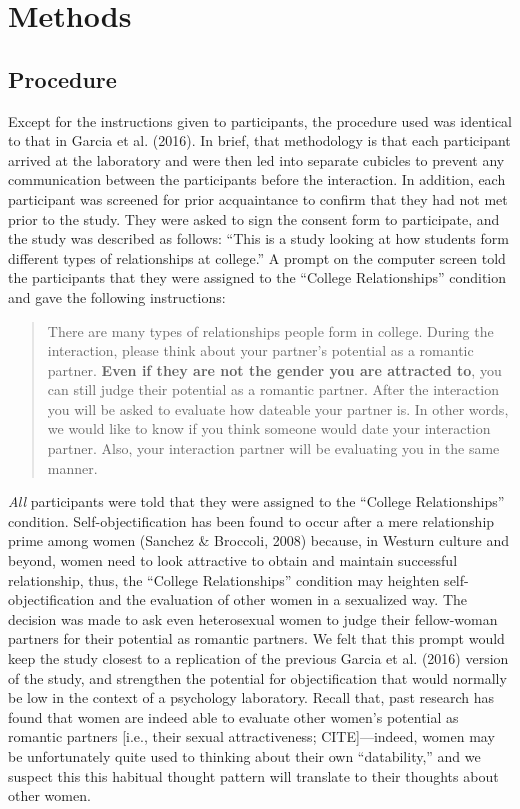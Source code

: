 \documentclass[man]{apa6}
\begin{document}
\section{Methods}\label{methods}

\subsection{Procedure}\label{procedure}

Except for the instructions given to participants, the procedure used
was identical to that in Garcia et al. (2016). In brief, that
methodology is that each participant arrived at the laboratory and were
then led into separate cubicles to prevent any communication between the
participants before the interaction. In addition, each participant was
screened for prior acquaintance to confirm that they had not met prior
to the study. They were asked to sign the consent form to participate,
and the study was described as follows: \enquote{This is a study looking
at how students form different types of relationships at college.} A
prompt on the computer screen told the participants that they were
assigned to the \enquote{College Relationships} condition and gave the
following instructions:

\begin{quote}
There are many types of relationships people form in college. During the
interaction, please think about your partner's potential as a romantic
partner. \textbf{Even if they are not the gender you are attracted to},
you can still judge their potential as a romantic partner. After the
interaction you will be asked to evaluate how dateable your partner is.
In other words, we would like to know if you think someone would date
your interaction partner. Also, your interaction partner will be
evaluating you in the same manner.
\end{quote}

\emph{All} participants were told that they were assigned to the
\enquote{College Relationships} condition. Self-objectification has been
found to occur after a mere relationship prime among women (Sanchez \&
Broccoli, 2008) because, in Westurn culture and beyond, women need to
look attractive to obtain and maintain successful relationship, thus,
the \enquote{College Relationships} condition may heighten
self-objectification and the evaluation of other women in a sexualized
way. The decision was made to ask even heterosexual women to judge their
fellow-woman partners for their potential as romantic partners. We felt
that this prompt would keep the study closest to a replication of the
previous Garcia et al. (2016) version of the study, and strengthen the
potential for objectification that would normally be low in the context
of a psychology laboratory. Recall that, past research has found that
women are indeed able to evaluate other women's potential as romantic
partners {[}i.e., their sexual attractiveness; CITE{]}---indeed, women
may be unfortunately quite used to thinking about their own
\enquote{datability,} and we suspect this this habitual thought pattern
will translate to their thoughts about other women.
\end{document}
